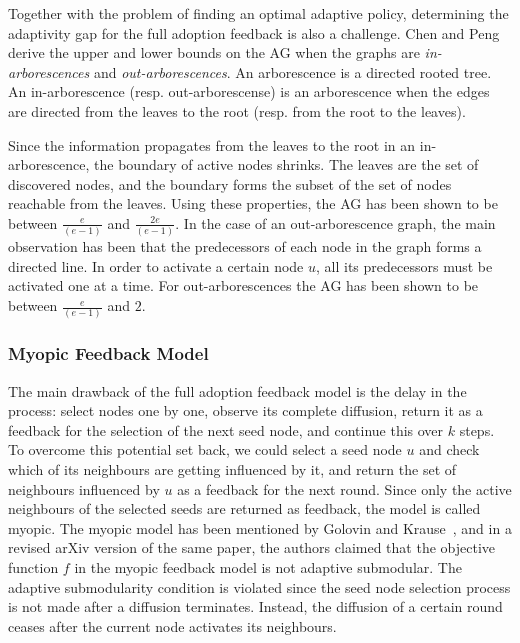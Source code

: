 Together with the problem of finding an optimal adaptive policy, determining the adaptivity gap for the full adoption feedback is also a challenge. Chen and Peng~\cite{Chen2019} derive the upper and lower bounds on the AG when the graphs are \emph{in-arborescences} and \emph{out-arborescences}. An arborescence is a directed rooted tree. An in-arborescence (resp. out-arborescense) is an arborescence when the edges are directed from the leaves to the root (resp. from the root to the leaves).

Since the information propagates from the leaves to the root in an in-arborescence, the boundary of active nodes shrinks. The leaves are the set of discovered nodes, and the boundary forms the subset of the set of nodes reachable from the leaves. Using these properties, the AG has been shown to be between $\frac {e}{(e-1)}$ and $\frac{2e}{(e-1)}$. In the case of an out-arborescence graph, the main observation has been that the predecessors of each node in the graph forms a directed line. In order to activate a certain node $u$, all its predecessors must be activated one at a time. For out-arborescences the AG has been shown to be between $\frac {e}{(e-1)}$ and $2$.


\subsubsection{Myopic Feedback Model}

The main drawback of the full adoption feedback model is the delay in the process: select nodes one by one, observe its complete diffusion, return it as a feedback for the selection of the next seed node, and continue this over $k$ steps. To overcome this potential set back, we could select a seed node $u$ and check which of its neighbours are getting influenced by it, and return the set of neighbours influenced by $u$ as a feedback for the next round. Since only the active neighbours of the selected seeds are returned as feedback, the model is called myopic. The myopic model has been mentioned by Golovin and Krause~\cite{Golovin2011}, and in a revised arXiv version of the same paper, the authors claimed that the objective function $f$ in the myopic feedback model is not adaptive submodular. The adaptive submodularity condition is violated since the seed node selection process is not made after a diffusion terminates. Instead, the diffusion of a certain round ceases after the current node activates its neighbours. 

